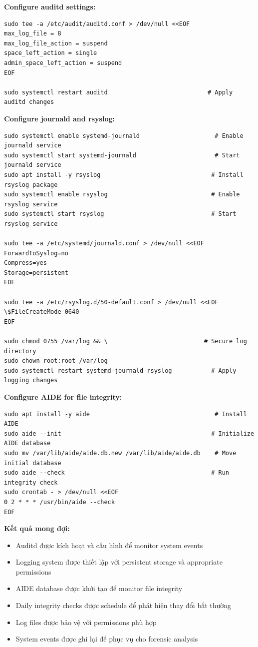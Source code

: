 \noindent \textbf{Configure auditd settings:}
\begin{verbatim}
sudo tee -a /etc/audit/auditd.conf > /dev/null <<EOF
max_log_file = 8
max_log_file_action = suspend
space_left_action = single
admin_space_left_action = suspend
EOF

sudo systemctl restart auditd                            # Apply auditd changes
\end{verbatim}

\noindent \textbf{Configure journald and rsyslog:}
\begin{verbatim}
sudo systemctl enable systemd-journald                     # Enable journald service
sudo systemctl start systemd-journald                      # Start journald service
sudo apt install -y rsyslog                               # Install rsyslog package
sudo systemctl enable rsyslog                             # Enable rsyslog service
sudo systemctl start rsyslog                              # Start rsyslog service

sudo tee -a /etc/systemd/journald.conf > /dev/null <<EOF
ForwardToSyslog=no
Compress=yes
Storage=persistent
EOF

sudo tee -a /etc/rsyslog.d/50-default.conf > /dev/null <<EOF
\$FileCreateMode 0640
EOF

sudo chmod 0755 /var/log && \                           # Secure log directory
sudo chown root:root /var/log
sudo systemctl restart systemd-journald rsyslog           # Apply logging changes
\end{verbatim}

\noindent \textbf{Configure AIDE for file integrity:}
\begin{verbatim}
sudo apt install -y aide                                   # Install AIDE
sudo aide --init                                          # Initialize AIDE database
sudo mv /var/lib/aide/aide.db.new /var/lib/aide/aide.db    # Move initial database
sudo aide --check                                         # Run integrity check
sudo crontab - > /dev/null <<EOF
0 2 * * * /usr/bin/aide --check
EOF
\end{verbatim}

\noindent \textbf{Kết quả mong đợi:}
\begin{itemize}
\item Auditd được kích hoạt và cấu hình để monitor system events
\item Logging system được thiết lập với persistent storage và appropriate permissions
\item AIDE database được khởi tạo để monitor file integrity
\item Daily integrity checks được schedule để phát hiện thay đổi bất thường
\item Log files được bảo vệ với permissions phù hợp
\item System events được ghi lại để phục vụ cho forensic analysis
\end{itemize}

